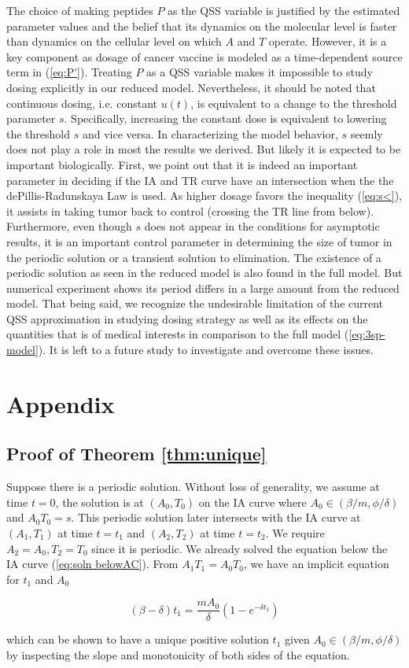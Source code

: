 \documentclass[review,authoryear]{elsarticle}
\begin{document}
The choice of making peptides $P$ as the QSS variable is justified
by the estimated parameter values and the belief that its dynamics on the molecular
level is faster than dynamics on the cellular level on which $A$
and $T$ operate. However, it is a key component as dosage of cancer
vaccine is modeled as a time-dependent source term in (\ref{eq:P'}).
Treating $P$ as a QSS variable makes it impossible to study dosing
explicitly in our reduced model. Nevertheless, it should be noted
that continuous dosing, i.e. constant $u(t)$, is equivalent to a
change to the threshold parameter $s$. Specifically, increasing the
constant dose is equivalent to lowering the threshold $s$ and vice versa. In characterizing the model behavior, $s$ seemly does not
play a role in most the results we derived. But likely it is expected
to be important biologically. First, we point out that it is indeed
an important parameter in deciding if the IA and TR curve have an
intersection when the the dePillis-Radunskaya Law is used. As higher
dosage favors the inequality (\ref{eq:s<}), it assists in taking
tumor back to control (crossing the TR line from below). Furthermore,
even though $s$ does not appear in the conditions for asymptotic
results, it is an important control parameter in determining the size
of tumor in the periodic solution or a transient solution to elimination.
The existence of a periodic solution as seen in the reduced model
is also found in the full model. But numerical experiment shows its
period differs in a large amount from the reduced model. That being
said, we recognize the undesirable limitation of the current QSS
approximation in studying dosing strategy as well as its effects on
the quantities that is of medical interests in comparison to the full
model (\ref{eq:3sp-model}). It is left to a future study to investigate and
overcome these issues. 

\section*{Appendix}
\subsection*{Proof of Theorem \ref{thm:unique}}
Suppose there is a periodic solution. Without loss of generality,
we assume at time $t=0$, the solution is at $(A_{0},T_{0})$ on the
IA curve where $A_{0}\in(\beta/m,\phi/\delta)$ and $A_{0}T_{0}=s$.
This periodic solution later intersects with the IA curve at $(A_{1},T_{1})$
at time $t=t_{1}$ and $(A_{2},T_{2})$ at time $t=t_{2}$. We require
$A_{2}=A_{0},T_{2}=T_{0}$ since it is periodic. We already solved
the equation below the IA curve (\ref{eq:soln belowAC}). From $A_{1}T_{1}=A_{0}T_{0}$, we
have an implicit equation for $t_{1}$ and $A_{0}$
\begin{linenomath*}
\begin{equation}
(\beta-\delta)t_{1}=\frac{mA_{0}}{\delta}(1-e^{-\delta t_{1}})\label{eq:A1T1=00003DA0T0}
\end{equation}
\end{linenomath*}
which can be shown to have a unique positive solution $t_{1}$ given $A_{0}\in(\beta/m,\phi/\delta)$ by inspecting the slope and monotonicity of both sides of the equation. 
\end{document}

